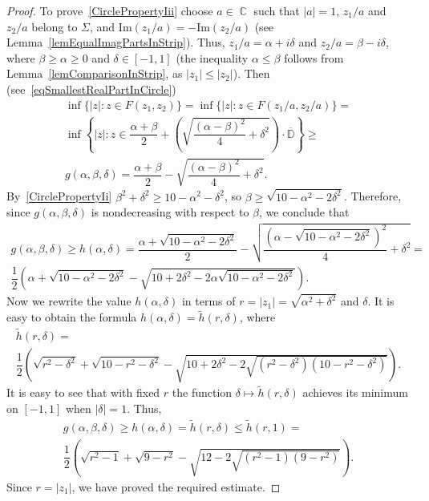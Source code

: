 \documentclass{amsart}
\numberwithin{equation}{section}
\theoremstyle{definition}
\theoremstyle{remark}
\DeclareMathOperator{\CC}{\mathbb C}
\begin{document}
\begin{proof}
		To prove~\ref{CirclePropertyIii} choose $a \in \CC$ such that $|a| = 1$, $z_1/a$ and $z_2/a$ belong to $\Sigma$, and $\mathrm{Im}(z_1/a) = -\mathrm{Im}(z_2/a)$ (see Lemma~\ref{lemEqualImagPartsInStrip}). Thus, $z_1/a = \alpha + i\delta$ and $z_2/a = \beta - i\delta$, where $\beta \ge \alpha \ge 0$ and $\delta \in [-1,1]$ (the inequality $\alpha \le \beta$ follows from Lemma~\ref{lemComparisonInStrip}, as $|z_1| \le |z_2|$). Then (see~\eqref{eqSmallestRealPartInCircle})
		\begin{multline*}
			\inf \{|z|: z\in F(z_1,z_2)\} = \inf \{|z|: z\in F(z_1/a, z_2/a)\} = \\ \inf \left\{|z|: z \in \dfrac{\alpha + \beta}{2} + \left(\sqrt{\dfrac{(\alpha - \beta)^2}{4} + \delta^2}\right)\cdot \overline{\mathbb D} \right\} \ge \\ g(\alpha, \beta, \delta) = \dfrac{\alpha + \beta}{2} - \sqrt{\dfrac{(\alpha - \beta)^2}{4} + \delta^2}.
		\end{multline*}
		By~\ref{CirclePropertyIi} $\beta^2 + \delta^2 \ge 10 - \alpha^2 - \delta^2$, so $\beta \ge \sqrt{10 - \alpha^2 - 2\delta^2}$. Therefore, since $g(\alpha, \beta, \delta)$ is nondecreasing with respect to $\beta$, we conclude that
		\begin{multline*}
			g(\alpha, \beta, \delta) \ge h(\alpha, \delta) = \dfrac{\alpha + \sqrt{10 - \alpha^2 - 2\delta^2}}{2} - \sqrt{\dfrac{(\alpha - \sqrt{10 - \alpha^2 - 2\delta^2})^2}{4} + \delta^2} =\\
			\dfrac{1}{2}\left(\alpha + \sqrt{10 - \alpha^2 - 2\delta^2} - \sqrt{10 + 2\delta^2 - 2\alpha \sqrt{10 - \alpha^2 - 2\delta^2}}\right).
		\end{multline*}
		Now we rewrite the value $h(\alpha, \delta)$ in terms of $r = |z_1| = \sqrt{\alpha^2 + \delta^2}$ and $\delta$. It is easy to obtain the formula $h(\alpha, \delta) = \tilde h(r, \delta)$, where
		\begin{multline*}
			\tilde h(r, \delta) = \\ \dfrac{1}{2}\left(\sqrt{r^2 - \delta^2} + \sqrt{10 -  r^2 - \delta^2} - \sqrt{10 + 2\delta^2 - 2\sqrt{(r^2 - \delta^2)(10 - r^2 - \delta^2)}}\right).
		\end{multline*}
		It is easy to see that with fixed $r$ the function $\delta \mapsto \tilde h(r, \delta)$ achieves its minimum on $[-1,1]$ when $|\delta| = 1$. Thus,
		\begin{multline*}
			g(\alpha, \beta, \delta) \ge h(\alpha, \delta) = \tilde h(r, \delta) \le \tilde h(r, 1) = \\ \dfrac{1}{2}\left(\sqrt{r^2 - 1} + \sqrt{9 -  r^2} - \sqrt{12 - 2\sqrt{(r^2 - 1)(9 - r^2)}}\right).
		\end{multline*}
		Since $r = |z_1|$, we have proved the required estimate.
	\end{proof}
\end{document}
